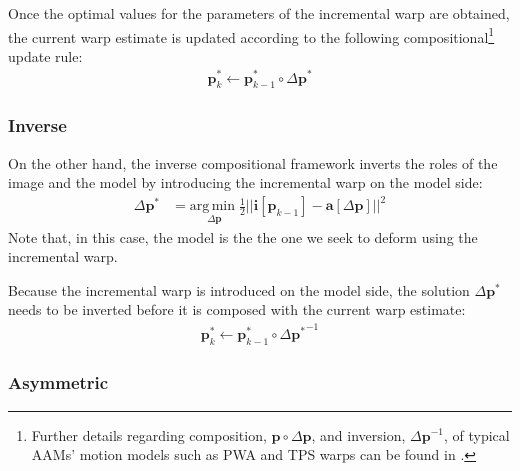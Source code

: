 Once the optimal values for the parameters of the incremental warp are obtained, the current warp estimate is updated according to the following compositional\footnote{\label{foot:warp}Further details regarding composition, $\mathbf{p} \circ \Delta \mathbf{p}$, and inversion, $\Delta \mathbf{p}^{-1}$, of typical AAMs' motion models such as PWA and TPS warps can be found in \cite{Matthews2004, Papandreou2008}.} update rule:
\begin{equation}
 	\begin{aligned}
    	\mathbf{p}_k^* \leftarrow \mathbf{p}_{k-1}^* \circ \Delta \mathbf{p}^*
    \label{eq:fc_update}
    \end{aligned}
\end{equation}

\subsubsection{Inverse}
\label{sec:inverse}

On the other hand, the inverse compositional framework inverts the roles of the image and the model by introducing the incremental warp on the model side:
\begin{equation}
    \begin{aligned}
        \Delta \mathbf{p}^* & = \underset{\Delta \mathbf{p}} {\mathrm{arg\, min\;}} \frac{1}{2}|| \mathbf{i}[\mathbf{p}_{k-1}] - \mathbf{a} [\Delta \mathbf{p}] ||^2
    \label{eq:ssd_ic}
    \end{aligned}
\end{equation}
Note that, in this case, the model is the the one we seek to deform using the incremental warp.

Because the incremental warp is introduced on the model side, the solution $\Delta \mathbf{p}^*$ needs to be inverted before it is composed with the current warp estimate:
\begin{equation}
 	\begin{aligned}
    	\mathbf{p}_k^* \leftarrow \mathbf{p}_{k-1}^* \circ \Delta {\mathbf{p}^*}^{-1} 
    \label{eq:ic_update}
    \end{aligned}
\end{equation}

\subsubsection{Asymmetric}
\label{sec:asymmetric}

